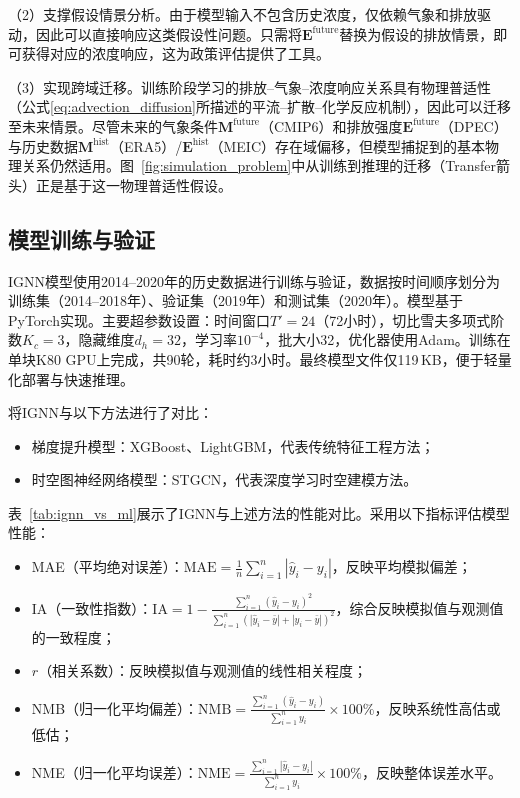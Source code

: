 （2）支撑假设情景分析。由于模型输入不包含历史浓度，仅依赖气象和排放驱动，因此可以直接响应这类假设性问题。只需将$\mathbf{E}^{\text{future}}$替换为假设的排放情景，即可获得对应的浓度响应，这为政策评估提供了工具。

（3）实现跨域迁移。训练阶段学习的排放--气象--浓度响应关系具有物理普适性（公式\eqref{eq:advection_diffusion}所描述的平流--扩散--化学反应机制），因此可以迁移至未来情景。尽管未来的气象条件$\mathbf{M}^{\text{future}}$（CMIP6）和排放强度$\mathbf{E}^{\text{future}}$（DPEC）与历史数据$\mathbf{M}^{\text{hist}}$（ERA5）/$\mathbf{E}^{\text{hist}}$（MEIC）存在域偏移，但模型捕捉到的基本物理关系仍然适用。图~\ref{fig:simulation_problem}中从训练到推理的迁移（Transfer箭头）正是基于这一物理普适性假设。


\subsection{模型训练与验证}
\label{subsec:ignn_validation}

IGNN模型使用2014--2020年的历史数据进行训练与验证，数据按时间顺序划分为训练集（2014--2018年）、验证集（2019年）和测试集（2020年）。模型基于PyTorch实现。主要超参数设置：时间窗口$T'=24$（72小时），切比雪夫多项式阶数$K_c=3$，隐藏维度$d_h=32$，学习率$10^{-4}$，批大小32，优化器使用Adam。训练在单块K80 GPU上完成，共90轮，耗时约3小时。最终模型文件仅119\,KB，便于轻量化部署与快速推理。

将IGNN与以下方法进行了对比：
\begin{itemize}
    \item 梯度提升模型：XGBoost\citep{chen2016xgboost}、LightGBM\citep{ke2017lightgbm}，代表传统特征工程方法；
    \item 时空图神经网络模型：STGCN\citep{yu2018spatio}，代表深度学习时空建模方法。
\end{itemize}

表~\ref{tab:ignn_vs_ml}展示了IGNN与上述方法的性能对比。采用以下指标评估模型性能\citep{evaluation}：

\begin{itemize}
    \item MAE（平均绝对误差）：$\text{MAE} = \frac{1}{n}\sum_{i=1}^{n}|\hat{y}_i - y_i|$，反映平均模拟偏差；
    \item IA（一致性指数）：$\text{IA} = 1 - \frac{\sum_{i=1}^{n}(\hat{y}_i - y_i)^2}{\sum_{i=1}^{n}(|\hat{y}_i - \bar{y}| + |y_i - \bar{y}|)^2}$，综合反映模拟值与观测值的一致程度；
    \item $r$（相关系数）：反映模拟值与观测值的线性相关程度；
    \item NMB（归一化平均偏差）：$\text{NMB} = \frac{\sum_{i=1}^{n}(\hat{y}_i - y_i)}{\sum_{i=1}^{n} y_i} \times 100\%$，反映系统性高估或低估；
    \item NME（归一化平均误差）：$\text{NME} = \frac{\sum_{i=1}^{n}|\hat{y}_i - y_i|}{\sum_{i=1}^{n} y_i} \times 100\%$，反映整体误差水平。
\end{itemize}

